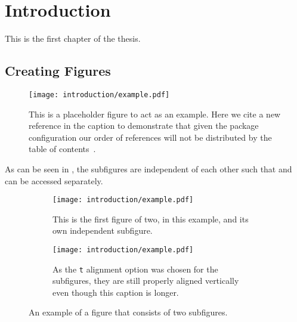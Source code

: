 \chapter{Introduction}\label{chapter:introduction}

This is the first chapter of the \gls{thesis}.~\cite{Aaboud:2016mmw,Bruning:782076}

\section{Creating Figures}\label{sec:figures}
\begin{figure}[htpb]
 \centering
 \texttt{[image: introduction/example.pdf]}
 \caption[Example placeholder figure with a citation~\cite{Higgs:1964ia} and shorter List of Figures caption.
  The List of Figures is protected from first use of glossary entries or acronyms like \acrlong{LHC}.]{%
  This is a placeholder figure to act as an example.
  Here we cite a new reference in the caption to demonstrate that given the package configuration our order of references will not be distributed by the table of contents~\cite{Higgs:1964ia}.}\label{fig:test_figure}
\end{figure}

As can be seen in , the subfigures are independent of each other such that  and  can be accessed separately.

\begin{figure}[htbp]
 \centering
 \begin{subfigure}[t]{0.48\textwidth}
  \centering
  \texttt{[image: introduction/example.pdf]}
  \caption[Short List of Figures captions work with subfigures too.]{%
   This is the first figure of two, in this example, and its own independent subfigure.}
  \label{fig:subfigure_1}
 \end{subfigure}%
 \quad
 \begin{subfigure}[t]{0.48\textwidth}
  \centering
  \texttt{[image: introduction/example.pdf]}
  \caption[Which makes the List of Figures readable and actually helpful.]{%
   As the \texttt{t} alignment option was chosen for the subfigures, they are still properly aligned vertically even though this caption is longer.}
  \label{fig:subfigure_2}
 \end{subfigure}
 \caption{An example of a figure that consists of two subfigures.}
 \label{fig:subfigure_example}
\end{figure}

